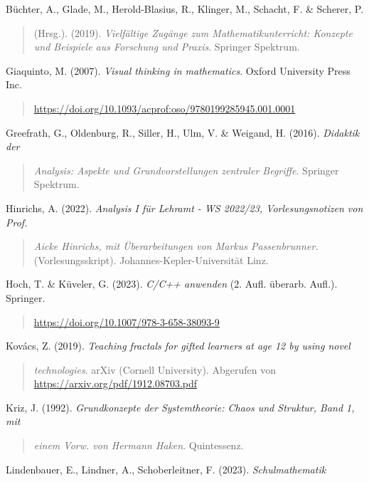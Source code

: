 \documentclass{book}
\begin{document}
Büchter, A., Glade, M., Herold-Blasius, R., Klinger, M., Schacht, F. \&
Scherer, P.

\begin{quote}
(Hrsg.). (2019). \emph{Vielfältige Zugänge zum Mathematikunterricht:
Konzepte und Beispiele aus Forschung und Praxis}. Springer Spektrum.
\end{quote}

Giaquinto, M. (2007). \emph{Visual thinking in mathematics}. Oxford
University Press Inc.

\begin{quote}
\url{https://doi.org/10.1093/acprof:oso/9780199285945.001.0001}
\end{quote}

Greefrath, G., Oldenburg, R., Siller, H., Ulm, V. \& Weigand, H. (2016).
\emph{Didaktik der}

\begin{quote}
\emph{Analysis: Aspekte und Grundvorstellungen zentraler Begriffe}.
Springer Spektrum.
\end{quote}

Hinrichs, A. (2022). \emph{Analysis I für Lehramt - WS 2022/23,
Vorlesungsnotizen von Prof.}

\begin{quote}
\emph{Aicke Hinrichs, mit Überarbeitungen von Markus Passenbrunner.}
(Vorlesungsskript). Johannes-Kepler-Universität Linz.
\end{quote}

Hoch, T. \& Küveler, G. (2023). \emph{C/C++ anwenden} (2. Aufl. überarb.
Aufl.). Springer.

\begin{quote}
\url{https://doi.org/10.1007/978-3-658-38093-9}
\end{quote}

Kovács, Z. (2019). \emph{Teaching fractals for gifted learners at age 12
by using novel}

\begin{quote}
\emph{technologies}. arXiv (Cornell University). Abgerufen von
\url{https://arxiv.org/pdf/1912.08703.pdf}
\end{quote}

Kriz, J. (1992). \emph{Grundkonzepte der Systemtheorie: Chaos und
Struktur, Band 1, mit}

\begin{quote}
\emph{einem Vorw. von Hermann Haken}. Quintessenz.
\end{quote}

Lindenbauer, E., Lindner, A., Schoberleitner, F. (2023).
\emph{Schulmathematik}
\end{document}
